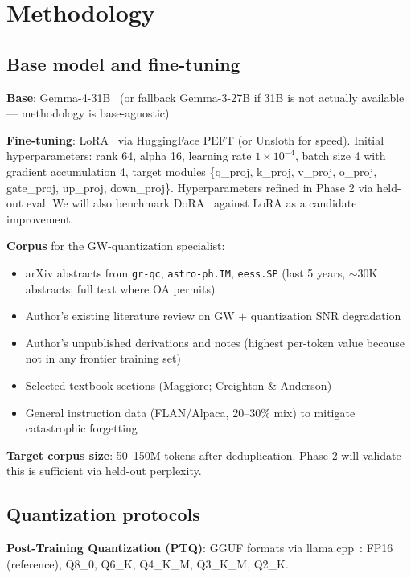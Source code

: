 \documentclass[11pt]{article}
\begin{document}
\section{Methodology}

\subsection{Base model and fine-tuning}

\textbf{Base}: Gemma-4-31B~\cite{gemmateam2025gemma3} (or fallback Gemma-3-27B if 31B is not actually available --- methodology is base-agnostic).

\textbf{Fine-tuning}: LoRA~\cite{hu2021lora} via HuggingFace PEFT (or Unsloth for speed). Initial hyperparameters: rank 64, alpha 16, learning rate $1 \times 10^{-4}$, batch size 4 with gradient accumulation 4, target modules \{q\_proj, k\_proj, v\_proj, o\_proj, gate\_proj, up\_proj, down\_proj\}. Hyperparameters refined in Phase 2 via held-out eval. We will also benchmark DoRA~\cite{liu2024dora} against LoRA as a candidate improvement.

\textbf{Corpus} for the GW-quantization specialist:
\begin{itemize}
  \item arXiv abstracts from \texttt{gr-qc}, \texttt{astro-ph.IM}, \texttt{eess.SP} (last 5 years, $\sim$30K abstracts; full text where OA permits)
  \item Author's existing literature review on GW $+$ quantization SNR degradation
  \item Author's unpublished derivations and notes (highest per-token value because not in any frontier training set)
  \item Selected textbook sections (Maggiore; Creighton \& Anderson)
  \item General instruction data (FLAN/Alpaca, 20--30\% mix) to mitigate catastrophic forgetting~\cite{luo2023catastrophic}
\end{itemize}

\textbf{Target corpus size}: 50--150M tokens after deduplication. Phase 2 will validate this is sufficient via held-out perplexity.

\subsection{Quantization protocols}

\textbf{Post-Training Quantization (PTQ)}: GGUF formats via llama.cpp~\cite{gerganov2023llamacpp}: FP16 (reference), Q8\_0, Q6\_K, Q4\_K\_M, Q3\_K\_M, Q2\_K.
\end{document}
